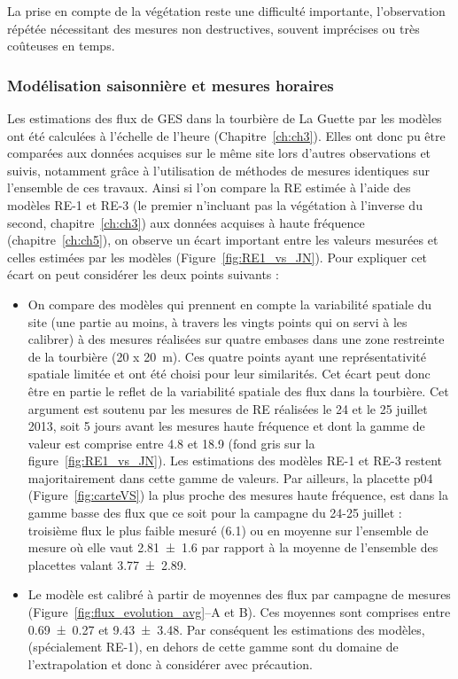 La prise en compte de la végétation reste une difficulté importante, l'observation répétée nécessitant des mesures non destructives, souvent imprécises ou très coûteuses en temps.


\subsubsection*{Modélisation saisonnière et mesures horaires}

Les estimations des flux de GES dans la tourbière de La Guette par les modèles ont été calculées à l'échelle de l'heure (Chapitre~\ref{ch:ch3}).
Elles ont donc pu être comparées aux données acquises sur le même site lors d'autres observations et suivis, notamment grâce à l'utilisation de méthodes de mesures identiques sur l'ensemble de ces travaux.
Ainsi si l'on compare la RE estimée à l'aide des modèles RE-1 et RE-3 (le premier n'incluant pas la végétation à l'inverse du second, chapitre~\ref{ch:ch3}) aux données acquises à haute fréquence (chapitre~\ref{ch:ch5}), on observe un écart important entre les valeurs mesurées et celles estimées par les modèles (Figure~\ref{fig:RE1_vs_JN}).
Pour expliquer cet écart on peut considérer les deux points suivants : 

\begin{itemize}
\item On compare des modèles qui prennent en compte la variabilité spatiale du site (une partie au moins, à travers les vingts points qui on servi à les calibrer) à des mesures réalisées sur quatre embases dans une zone restreinte de la tourbière (20 x \SI{20}{\metre}).
Ces quatre points ayant une représentativité spatiale limitée et ont été choisi pour leur similarités.
Cet écart peut donc être en partie le reflet de la variabilité spatiale des flux dans la tourbière.
Cet argument est soutenu par les mesures de RE réalisées le 24 et le 25 juillet 2013, soit 5 jours avant les mesures haute fréquence et dont la gamme de valeur est comprise entre \num{4.8} et \SI{18.9}{\uml} (fond gris sur la figure~\ref{fig:RE1_vs_JN}).
Les estimations des modèles RE-1 et RE-3 restent majoritairement dans cette gamme de valeurs.
Par ailleurs, la placette p04 (Figure~\ref{fig:carteVS}) la plus proche des mesures haute fréquence, est dans la gamme basse des flux que ce soit pour la campagne du 24-25 juillet : troisième flux le plus faible mesuré (\SI{6.1}{\uml}) ou en moyenne sur l'ensemble de mesure où elle vaut \SI{2.81(160)}{\uml} par rapport à la moyenne de l'ensemble des placettes valant \SI{3.77(289)}{\uml}.
\item Le modèle est calibré à partir de moyennes des flux par campagne de mesures (Figure~\ref{fig:flux_evolution_avg}--A et B).
Ces moyennes sont comprises entre \num{0.69(027)} et \SI{9.43(348)}{\uml}.
Par conséquent les estimations des modèles, (spécialement RE-1), en dehors de cette gamme sont du domaine de l'extrapolation et donc à considérer avec précaution.
\end{itemize}

